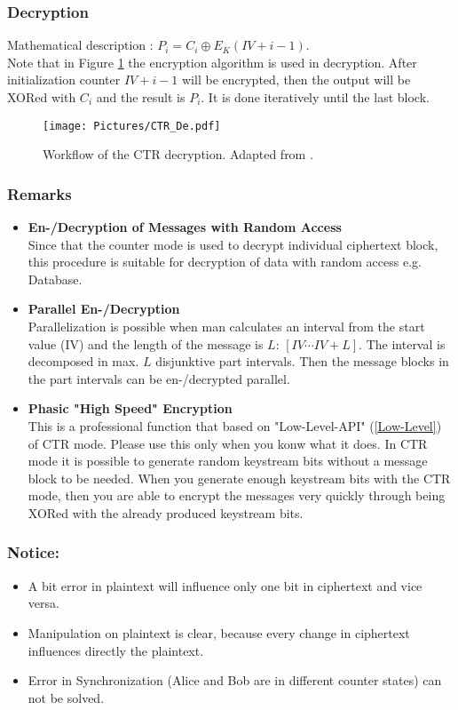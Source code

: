 \subsubsection*{Decryption}
Mathematical description : $P_i=C_i\oplus E_K(IV+i-1)$.\\
Note that in Figure \ref{CTRDE} the encryption algorithm is used in decryption.
After initialization counter $IV+i-1$ will be encrypted, then the output will be XORed with $C_i$ and the result is $P_i$. It is done iteratively until the last block.
\begin{figure}[h]
\centering
\texttt{[image: Pictures/CTR\_De.pdf]} 
\caption{Workflow of the CTR decryption. Adapted from \cite{DBLP:reference/crypt/2011}.}\label{CTRDE}
\end{figure}
\subsubsection*{Remarks}
\begin{itemize}
\item \textbf{En-/Decryption of Messages with Random Access}\\
Since that the counter mode is used to decrypt individual ciphertext block, this procedure is suitable for decryption of data with random access e.g. Database.
\item \textbf{Parallel En-/Decryption}\\
Parallelization is possible when man calculates an interval from the start value (IV) and the length of the message is $L$: $[IV\cdots IV+L]$. The interval is decomposed in max. $L$ disjunktive part intervals. Then the message blocks in the part intervals can be en-/decrypted parallel.
\item \textbf{Phasic "High Speed" Encryption}\\
This is a professional function that based on "Low-Level-API" (\ref{Low-Level}) of CTR mode. Please use this only when you konw what it does. In CTR mode it is possible to generate random keystream bits without a message block to be needed. When you generate enough keystream bits with the CTR mode, then you are able to encrypt the messages very quickly through being XORed with the already produced keystream bits.
\end{itemize}
\subsubsection*{Notice:}
\begin{itemize}
\item A bit error in plaintext will influence only one bit in ciphertext and vice versa.
\item Manipulation on plaintext is clear, because every change in ciphertext influences directly the plaintext.
\item Error in Synchronization (Alice and Bob are in different counter states) can not be solved. 
\end{itemize}
